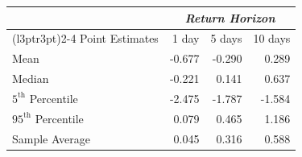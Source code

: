 
\begin{tabular}{lrrr}
\toprule
\multicolumn{1}{c}{\em{ }} & \multicolumn{3}{c}{\em{Return Horizon}} \\
\cmidrule(l{3pt}r{3pt}){2-4}
Point Estimates & 1 day & 5 days & 10 days\\
\midrule
Mean & -0.677 & -0.290 & 0.289\\
Median & -0.221 & 0.141 & 0.637\\
$5^\text{th}$ Percentile & -2.475 & -1.787 & -1.584\\
$95^\text{th}$ Percentile & 0.079 & 0.465 & 1.186\\
\midrule
Sample Average & 0.045 & 0.316 & 0.588\\
\bottomrule
\end{tabular}
